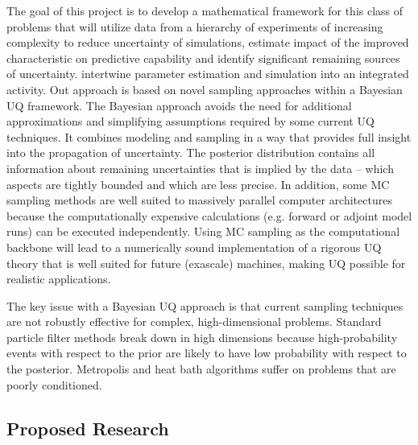 \documentclass[11pt]{article}
\newcommand{\MarginPar}[1]{\marginpar{%
\vskip-\baselineskip %
\raggedright\tiny\sffamily
\hrule\smallskip{\color{red}#1}\par\smallskip\hrule}}
\begin{document}
The goal of this project is to develop a
mathematical framework for this class of problems that
will utilize data from a hierarchy of experiments of increasing complexity to reduce
uncertainty of simulations, estimate impact of the improved characteristic on predictive capability
and identify significant remaining sources of uncertainty.
intertwine parameter estimation and simulation into an integrated activity.
Out approach is based on novel sampling approaches within a Bayesian UQ framework.
The Bayesian approach avoids the need for additional approximations and simplifying assumptions 
required by some current UQ techniques.
It combines modeling and sampling in a way that provides full insight into the propagation of 
uncertainty.
The posterior distribution contains all information about remaining uncertainties that is implied
by the data -- which aspects are tightly bounded and which are less precise.
In addition, some MC sampling methods are well suited to massively parallel computer architectures because
the computationally expensive calculations
(e.g. forward or adjoint model runs) can be executed independently.
Using MC sampling as the computational backbone will lead to a numerically sound implementation of a rigorous UQ theory
that is well suited for future (exascale) machines, making UQ possible for realistic applications.

The key issue with a Bayesian UQ approach is that current sampling techniques
are not robustly effective for complex, high-dimensional problems.
Standard particle filter methods break down in high dimensions because high-probability events 
with respect to the prior are likely to have low probability with respect to the posterior. 
Metropolis and heat bath algorithms suffer on problems that are poorly conditioned.
\MarginPar{Turn this into literature review?}

\subsection*{Proposed Research}
\end{document}
